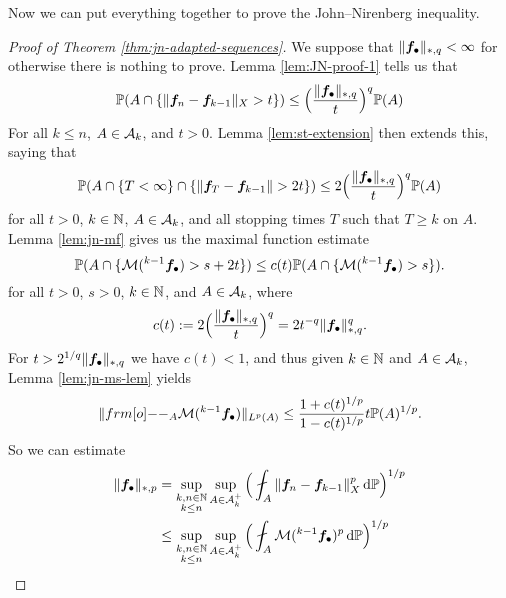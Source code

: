 Now we can put everything together to prove the John--Nirenberg inequality.

\begin{proof}[Proof of Theorem \ref{thm:jn-adapted-sequences}]
  We suppose that $\|\bm{f}_{\bullet}\|_{*,q} < \infty$ for otherwise there is nothing to prove.
  Lemma \ref{lem:JN-proof-1} tells us that
  \begin{equation}\label{eq:JN-proof-1-est-end}
    \mathbb{P}(A \cap \{ \|\bm{f}_n - \bm{f}_{k-1}\|_{X} > t \}) \leq \Big( \frac{\|\bm{f}_{\bullet}\|_{*,q}}{t} \Big)^{q} \mathbb{P}(A)
  \end{equation}
  For all $k \leq n$, $A \in \mathcal{A}_k$, and $t > 0$.
  Lemma \ref{lem:st-extension} then extends this, saying that
  \begin{equation}\label{eq:jn-stoptime-end}
    \mathbb{P}(A \cap \{T < \infty\} \cap \{ \| \bm{f}_{T} - \bm{f}_{k-1} \| > 2t \} ) \leq 2\Big( \frac{\|\bm{f}_{\bullet}\|_{*,q}}{t} \Big)^{q} \mathbb{P}(A)
  \end{equation}
  for all $t > 0$, $k \in \mathbb{N}$, $A \in \mathcal{A}_k$, and all stopping times $T$ such that $T \geq k$ on $A$.
  Lemma \ref{lem:jn-mf} gives us the maximal function estimate
  \begin{equation}\label{eq:jn-mf-eq-end}
    \mathbb{P}(A \cap \{ \mathcal{M}({}^{k-1} \bm{f}_{\bullet}) > s + 2t \}) \leq c(t) \mathbb{P}(A \cap \{  \mathcal{M}({}^{k-1} \bm{f}_{\bullet}) > s \}).
  \end{equation}
  for all $t > 0$, $s > 0$, $k \in \mathbb{N}$, and $A \in \mathcal{A}_{k}$, where
  \begin{equation*}
    c(t) := 2\Big( \frac{\|\bm{f}_{\bullet}\|_{*,q}}{t} \Big)^{q} = 2t^{-q} \|\bm{f}_{\bullet}\|_{*,q}^{q}.
  \end{equation*}
  For $t > 2^{1/q} \|\bm{f}_{\bullet}\|_{*,q}$  we have $c(t) < 1$, and thus given $k \in \mathbb{N}$ and $A \in \mathcal{A}_{k}$, Lemma \ref{lem:jn-ms-lem} yields
  \begin{equation*}
    \|\1_{A} \mc{M}({}^{k-1} \mb{f}_{\bullet})\|_{L^p(A)} \leq \frac{1 + c(t)^{1/p}}{1 - c(t)^{1/p}} t \P(A)^{1/p}.
  \end{equation*}
  So we can estimate
  \begin{equation*}
    \begin{aligned}
      \|\mb{f}_{\bullet}\|_{*,p}
      &= \sup_{\substack{k,n \in \N \\ k \leq n}} \sup_{A \in \mc{A}_{k}^{+}} \Big( \fint_{A} \|\mb{f}_{n} - \mb{f}_{k-1} \|_{X}^{p} \, \dd\P \Big)^{1/p} \\
      &\leq \sup_{\substack{k,n \in \N \\ k \leq n}} \sup_{A \in \mc{A}_{k}^{+}} \Big( \fint_{A} \mc{M}({}^{k-1}\mb{f}_{\bullet})^{p} \, \dd\P \Big)^{1/p} \\

\end{aligned}
\end{equation*}
\end{proof}
